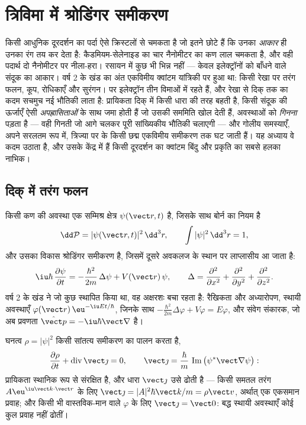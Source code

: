 \chapter{त्रिविमा में श्रोडिंगर समीकरण}\label{ch:b3:schrodinger-three-dimensions}

किसी आधुनिक दूरदर्शन का पर्दा ऐसे क्रिस्टलों से चमकता है जो इतने छोटे
हैं कि उनका \emph{आकार} ही उनका रंग तय कर देता है: कैडमियम-सेलेनाइड का
चार नैनोमीटर का कण लाल चमकता है, और वही पदार्थ दो नैनोमीटर पर
नीला-हरा। रसायन में कुछ भी भिन्न नहीं --- केवल इलेक्ट्रॉनों को बाँधने
वाले संदूक का आकार। वर्ष 2 के खंड का अंत एकविमीय
क्वांटम यांत्रिकी पर हुआ था: किसी रेखा पर तरंग फलन, कूप,
रोधिकाएँ और सुरंगन। पर इलेक्ट्रॉन तीन विमाओं में रहते हैं, और
रेखा से दिक् तक का कदम सचमुच नई भौतिकी लाता है:
प्रायिकता दिक् में किसी धारा की तरह बहती है, किसी संदूक की ऊर्जाएँ
ऐसी \emph{अपह्रासिताओं} के साथ जमा होती हैं जो उसकी सममिति खोल देती
हैं, अवस्थाओं को \emph{गिनना} पड़ता है --- वही गिनती जो आगे चलकर पूरी
सांख्यिकीय भौतिकी चलाएगी --- और गोलीय समस्याएँ, अपने सरलतम रूप में,
त्रिज्या पर के किसी छद्म एकविमीय समीकरण तक घट जाती हैं। यह अध्याय
वे कदम उठाता है, और उसके केंद्र में हैं किसी दूरदर्शन का क्वांटम बिंदु
और प्रकृति का सबसे हलका नाभिक।

\section{दिक् में तरंग फलन}

\begin{definition}[त्रिविमा में तरंग फलन और प्रायिकता]\label{def:b3:schrodinger-three-dimensions:psi3d}
किसी कण की अवस्था एक सम्मिश्र क्षेत्र $\psi(\vect r, t)$ है, जिसके साथ
बोर्न का नियम है
\[
\dd\mathcal P = |\psi(\vect r, t)|^2\,\dd^3r , \qquad
\int|\psi|^2\,\dd^3r = 1 ,
\]
और उसका विकास श्रोडिंगर समीकरण है, जिसमें दूसरे अवकलज के स्थान पर
लाप्लासीय आ जाता है:
\[
\iu\hbar\,\frac{\partial\psi}{\partial t}
 = -\frac{\hbar^2}{2m}\,\Delta\psi + V(\vect r)\,\psi ,
\qquad
\Delta = \frac{\partial^2}{\partial x^2} +
\frac{\partial^2}{\partial y^2} + \frac{\partial^2}{\partial z^2} .
\]
वर्ष 2 के खंड ने जो कुछ स्थापित किया था, वह अक्षरशः बचा रहता है:
रैखिकता और अध्यारोपण, स्थायी अवस्थाएँ
$\varphi(\vect r)\,\eu^{-\iu Et/\hbar}$, जिनके साथ
$-\tfrac{\hbar^2}{2m}\Delta\varphi + V\varphi = E\varphi$, और
संवेग संकारक, जो अब प्रवणता $\hat{\vect p} =
-\iu\hbar\vect\nabla$ है।
\end{definition}

\begin{proposition}[प्रायिकता बहती है: धारा]\label{prop:b3:schrodinger-three-dimensions:current}
घनत्व $\rho = |\psi|^2$ किसी सांतत्य समीकरण का पालन करता है,
\[
\frac{\partial\rho}{\partial t} + \operatorname{div}\vect\jmath = 0 ,
\qquad
\vect\jmath = \frac{\hbar}{m}\,
\operatorname{Im}\big(\psi^*\vect\nabla\psi\big) :
\]
प्रायिकता स्थानिक रूप से संरक्षित है, और धारा
$\vect\jmath$ उसे ढोती है --- किसी समतल तरंग $A\eu^{\iu\vect k\cdot\vect r}$
के लिए $\vect\jmath = |A|^2\hbar\vect k/m = \rho\vect v$, अर्थात् एक
एकसमान प्रवाह; और किसी भी वास्तविक-मान वाले $\varphi$ के लिए
$\vect\jmath = \vect 0$: बद्ध स्थायी अवस्थाएँ कोई कुल प्रवाह नहीं ढोतीं।
\end{proposition}

